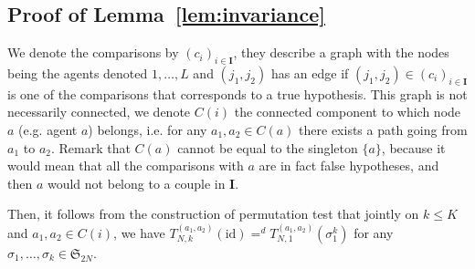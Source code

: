\documentclass{article}
\theoremstyle{plain}
\theoremstyle{remark}
\renewcommand{\S}{\mathfrak{S}}
\newcommand{\1}{\mathbbm{1}}
\newcommand{\id}{\mathrm{id}}
\numberwithin{equation}{section}
\begin{document}
\subsection{Proof of Lemma~\ref{lem:invariance}}
We denote the comparisons by $(c_i)_{i \in \textbf{I}}$, they describe a graph with the nodes being the agents denoted $1,\dots,L$ and $(j_1,j_2)$ has an edge if $(j_1,j_2)\in(c_i)_{i \in \textbf{I}}$ is one of the comparisons that corresponds to a true hypothesis. This graph is not necessarily connected, we denote $C(i)$ the connected component to which node $a$ (e.g. agent $a$) belongs, i.e. for any $a_1,a_2 \in C(a)$ there exists a path going from $a_1$ to $a_2$. Remark that $C(a)$ cannot be equal to the singleton $\{a\}$, because it would mean that all the comparisons with $a$ are in fact false hypotheses, and then $a$ would not belong to a couple in $\textbf{I}$.

Then, it follows from the construction of permutation test that jointly on $k\le K$ and $a_1,a_2 \in C(i)$, we have $T_{N,k}^{(a_1,a_2)}(\id)=^d T_{N,1}^{(a_1,a_2)}(\sigma_1^k)$ for any $\sigma_1,\dots,\sigma_k \in  \S_{2N}$.
\end{document}
